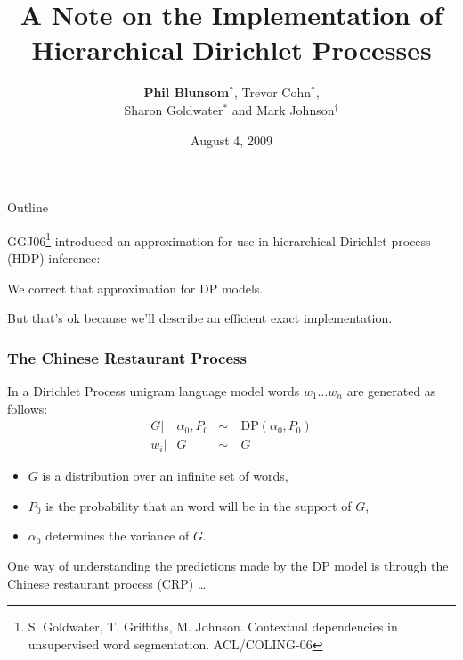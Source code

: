 \documentclass{beamer}
\title[A Note on the Implemention of HDPs]{A Note on the Implementation of Hierarchical Dirichlet Processes}
\author[Blunsom et al.]{{\bf Phil Blunsom}$^*$, Trevor Cohn$^*$, \\Sharon
Goldwater$^*$ and Mark Johnson$^\dagger$}
\institute[Uni. of Edinburgh] %
{
  $^*$School of Informatics, University of Edinburgh \\
  $^\dagger$Department of Cognitive and Linguistic Sciences, Brown University \\
}
\date{August 4, 2009}
\newenvironment{unpacked_itemize}{
\begin{itemize}
  \setlength{\itemsep}{10pt}
  \setlength{\parskip}{0pt}
  \setlength{\parsep}{0pt}
}{\end{itemize}}
\begin{document}
\begin{frame}
  \titlepage
\end{frame}


\begin{frame}[t]{Outline}
\vspace{0.5in}
\Large
\begin{unpacked_itemize}
 \item GGJ06\footnote{S. Goldwater, T. Griffiths, M. Johnson.
Contextual dependencies in unsupervised word segmentation. ACL/COLING-06} 
introduced an approximation for use in hierarchical Dirichlet process (HDP) inference: \\ 
 \item We correct that approximation for DP models. \\ 
 \item But that's ok because we'll describe an efficient exact implementation.
\end{unpacked_itemize}
\end{frame}

\begin{frame}
\frametitle{The Chinese Restaurant Process}
In a Dirichlet Process unigram language model  words $w_1 \ldots w_n$ are generated as follows: 
\begin{align}
\nonumber G | & \alpha_0, P_0 &\sim & ~ \mbox{DP}(\alpha_0,P_0) \\
\nonumber w_i | & G &\sim & ~ G 
\end{align}
\begin{itemize}
  \item $G$ is a distribution over an infinite set of words, 
  \item $P_0$ is the probability that an word will be in the support of $G$, 
  \item $\alpha_0$ determines the variance of $G$.
\end{itemize}
\vspace{0.2in}
One way of understanding the predictions made by the DP model is through the Chinese restaurant process (CRP) \dots
\end{frame}
\end{document}
